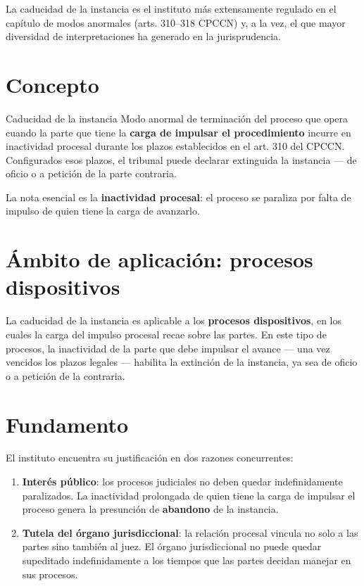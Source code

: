 \documentclass[12pt,oneside]{book}
\begin{document}
La caducidad de la instancia es el instituto más extensamente regulado en el capítulo de modos anormales (arts. 310--318 CPCCN) y, a la vez, el que mayor diversidad de interpretaciones ha generado en la jurisprudencia.

\section{Concepto}

\begin{definition}{Caducidad de la instancia}
Modo anormal de terminación del proceso que opera cuando la parte que tiene la \textbf{carga de impulsar el procedimiento} incurre en inactividad procesal durante los plazos establecidos en el art. 310 del CPCCN. Configurados esos plazos, el tribunal puede declarar extinguida la instancia --- de oficio o a petición de la parte contraria.
\end{definition}

La nota esencial es la \textbf{inactividad procesal}: el proceso se paraliza por falta de impulso de quien tiene la carga de avanzarlo.

\section{Ámbito de aplicación: procesos dispositivos}

La caducidad de la instancia es aplicable a los \textbf{procesos dispositivos}, en los cuales la carga del impulso procesal recae sobre las partes. En este tipo de procesos, la inactividad de la parte que debe impulsar el avance --- una vez vencidos los plazos legales --- habilita la extinción de la instancia, ya sea de oficio o a petición de la contraria.

\section{Fundamento}

El instituto encuentra su justificación en dos razones concurrentes:

\begin{enumerate}
    \item \textbf{Interés público}: los procesos judiciales no deben quedar indefinidamente paralizados. La inactividad prolongada de quien tiene la carga de impulsar el proceso genera la presunción de \textbf{abandono} de la instancia.
    \item \textbf{Tutela del órgano jurisdiccional}: la relación procesal vincula no solo a las partes sino también al juez. El órgano jurisdiccional no puede quedar supeditado indefinidamente a los tiempos que las partes decidan manejar en sus procesos.
\end{enumerate}
\end{document}
